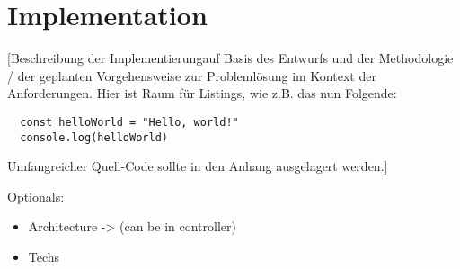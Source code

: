 \chapter{Implementation}

[Beschreibung der Implementierung\footnotemark auf Basis des Entwurfs und der Methodologie / der geplanten Vorgehensweise zur Probleml\"osung im Kontext der Anforderungen. Hier ist Raum f\"ur Listings, wie z.B. das nun Folgende:



\begin{listing}[H]
\begin{verbatim}
  const helloWorld = "Hello, world!"
  console.log(helloWorld)
\end{verbatim}
\end{listing}

Umfangreicher Quell-Code sollte in den Anhang ausgelagert werden.]





Optionals:
\begin{itemize}
  \item Architecture -> (can be in controller)
  \item Techs 
\end{itemize}